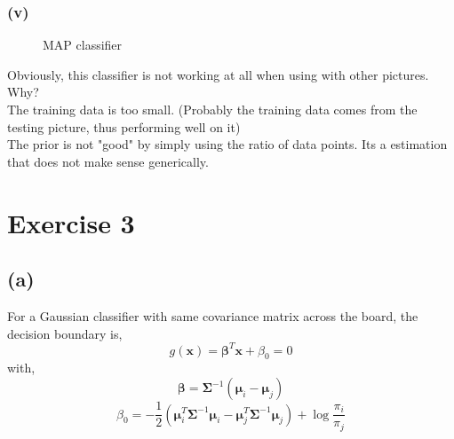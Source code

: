 \documentclass[11pt]{article}
\begin{document}
\subsubsection*{(v)}
\begin{figure}[h]
	\centering
	\caption{MAP classifier}
\end{figure}

\noindent Obviously, this classifier is not working at all when using with other pictures.\\
Why?\\
The training data is too small. (Probably the training data comes from the testing picture, thus performing well on it)\\
The prior is not "good" by simply using the ratio of data points. Its a estimation that does not make sense generically.

\pagebreak
\section*{Exercise 3}
\subsection*{(a)}
For a Gaussian classifier with same covariance matrix across the board, the decision boundary is,
$$g(\pmb{x}) = \pmb{\beta}^T\pmb{x}+\beta_0=0$$
with,
$$\pmb{\beta} = \pmb{\Sigma}^{-1}(\pmb{\mu}_i-\pmb{\mu}_j)$$
$$\beta_0=-\frac{1}{2}\left(\pmb{\mu}_i^T\pmb{\Sigma}^{-1}\pmb{\mu}_i-\pmb{\mu}_j^T\pmb{\Sigma}^{-1}\pmb{\mu}_j\right)+\log\frac{\pi_i}{\pi_j}$$
\end{document}
